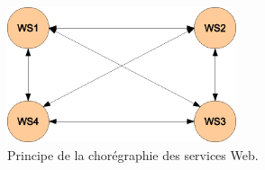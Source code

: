 \begin{figure}[h]
    \centering
    \includegraphics[width=0.6\textwidth]{figs/choregraphie.eps}
    \caption{Principe de la chorégraphie des services Web.}
    \label{fig:choregraphie}
\end{figure}